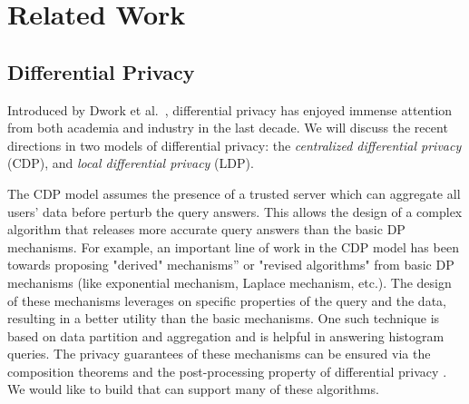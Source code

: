\section{Related Work}\label{app:related}
\subsection{Differential Privacy}\label{app:dp}
Introduced by Dwork et al.~\cite{Dork}, differential privacy has enjoyed immense attention from both academia and industry in the last decade. We will  discuss the recent directions in two models of differential privacy: the \textit{centralized differential privacy} (CDP), and \textit{local differential privacy} (LDP).

The \textsf{CDP} model assumes the presence of a trusted server which can aggregate all users' data  before perturb the query answers. This allows the design of a complex algorithm that releases more accurate query answers than the basic DP mechanisms. For example, an important line of work in the \textsf{CDP} model has been towards proposing "derived" mechanisms'' \cite{MVG} or  "revised algorithms" \cite{Blocki} from basic DP mechanisms (like exponential mechanism, Laplace mechanism, etc.). The design of these mechanisms leverages on specific properties of the query and the data, resulting in a better utility than the basic mechanisms.  One such technique is based on data partition and aggregation \cite{AHP,hist1,hist2,hist3,hist4,hist6,hist7,hist8} and is helpful in answering histogram queries. The privacy guarantees of these mechanisms can be ensured via the composition theorems and the post-processing property of differential privacy \cite{Dork}. We would like to build \system that can support many of these algorithms. %


